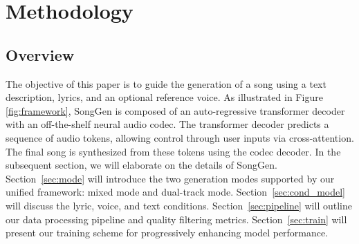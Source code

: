 \section{Methodology}



\subsection{Overview}




The objective of this paper is to guide the generation of a song using a text description, lyrics, and an optional reference voice.
As illustrated in Figure \ref{fig:framework}, SongGen is composed of an auto-regressive transformer decoder with an off-the-shelf neural audio codec. The transformer decoder predicts a sequence of audio tokens, allowing control through user inputs via cross-attention. The final song is synthesized from these tokens using the codec decoder.
In the subsequent section, we will elaborate on the details of SongGen. Section~\ref{sec:mode} will introduce the two generation modes supported by our unified framework: mixed mode and dual-track mode. Section~\ref{sec:cond_model} will discuss the lyric, voice, and text conditions. Section~\ref{sec:pipeline} will outline our data processing pipeline and quality filtering metrics. Section~\ref{sec:train} will present our training scheme for progressively enhancing model performance.
















